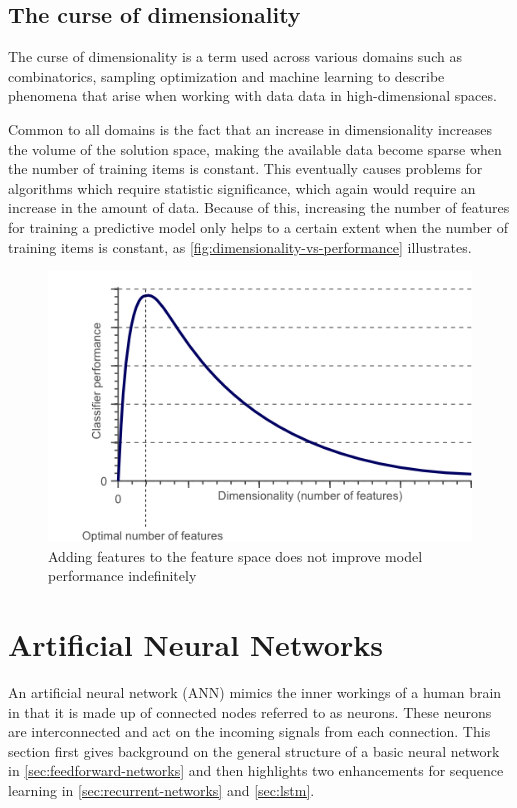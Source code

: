\subsection{The curse of dimensionality}
The curse of dimensionality is a term used across various domains such as combinatorics, sampling optimization and machine learning to describe phenomena that arise when working with data data in high-dimensional spaces.

Common to all domains is the fact that an increase in dimensionality increases the volume of the solution space, making the available data become sparse when the number of training items is constant. This eventually causes problems for algorithms which require statistic significance, which again would require an increase in the amount of data.
Because of this, increasing the number of features for training a predictive model only helps to a certain extent when the number of training items is constant, as \autoref{fig:dimensionality-vs-performance} illustrates.

\begin{figure}
    \centering
    \includegraphics[width=.75\textwidth]{gfx/dimensionality_vs_performance.png}
    \caption[The curse of dimensionality, visualized]{Adding features to the feature space does not improve model performance indefinitely}
    \label{fig:dimensionality-vs-performance}
\end{figure}

\section{Artificial Neural Networks}\label{sec:artificial-neural-networks}
An artificial neural network (ANN) mimics the inner workings of a human brain in that it is made up of connected nodes referred to as neurons. These neurons are interconnected and act on the incoming signals from each connection. This section first gives background on the general structure of a basic neural network in \autoref{sec:feedforward-networks} and then highlights two enhancements for sequence learning in \autoref{sec:recurrent-networks} and \autoref{sec:lstm}.

